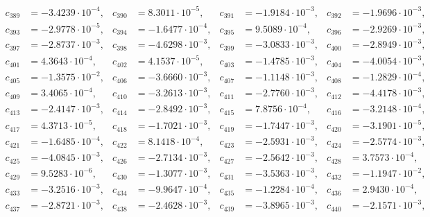 \begin{align*}
c_{ 389 } &= -3.4239 \cdot 10^{ -4 }, & c_{ 390 } &= 8.3011 \cdot 10^{ -5 }, & c_{ 391 } &= -1.9184 \cdot 10^{ -3 }, & c_{ 392 } &= -1.9696 \cdot 10^{ -3 },\\ 
c_{ 393 } &= -2.9778 \cdot 10^{ -5 }, & c_{ 394 } &= -1.6477 \cdot 10^{ -4 }, & c_{ 395 } &= 9.5089 \cdot 10^{ -4 }, & c_{ 396 } &= -2.9269 \cdot 10^{ -3 },\\ 
c_{ 397 } &= -2.8737 \cdot 10^{ -3 }, & c_{ 398 } &= -4.6298 \cdot 10^{ -3 }, & c_{ 399 } &= -3.0833 \cdot 10^{ -3 }, & c_{ 400 } &= -2.8949 \cdot 10^{ -3 },\\ 
c_{ 401 } &= 4.3643 \cdot 10^{ -4 }, & c_{ 402 } &= 4.1537 \cdot 10^{ -5 }, & c_{ 403 } &= -1.4785 \cdot 10^{ -3 }, & c_{ 404 } &= -4.0054 \cdot 10^{ -3 },\\ 
c_{ 405 } &= -1.3575 \cdot 10^{ -2 }, & c_{ 406 } &= -3.6660 \cdot 10^{ -3 }, & c_{ 407 } &= -1.1148 \cdot 10^{ -3 }, & c_{ 408 } &= -1.2829 \cdot 10^{ -4 },\\ 
c_{ 409 } &= 3.4065 \cdot 10^{ -4 }, & c_{ 410 } &= -3.2613 \cdot 10^{ -3 }, & c_{ 411 } &= -2.7760 \cdot 10^{ -3 }, & c_{ 412 } &= -4.4178 \cdot 10^{ -3 },\\ 
c_{ 413 } &= -2.4147 \cdot 10^{ -3 }, & c_{ 414 } &= -2.8492 \cdot 10^{ -3 }, & c_{ 415 } &= 7.8756 \cdot 10^{ -4 }, & c_{ 416 } &= -3.2148 \cdot 10^{ -4 },\\ 
c_{ 417 } &= 4.3713 \cdot 10^{ -5 }, & c_{ 418 } &= -1.7021 \cdot 10^{ -3 }, & c_{ 419 } &= -1.7447 \cdot 10^{ -3 }, & c_{ 420 } &= -3.1901 \cdot 10^{ -5 },\\ 
c_{ 421 } &= -1.6485 \cdot 10^{ -4 }, & c_{ 422 } &= 8.1418 \cdot 10^{ -4 }, & c_{ 423 } &= -2.5931 \cdot 10^{ -3 }, & c_{ 424 } &= -2.5774 \cdot 10^{ -3 },\\ 
c_{ 425 } &= -4.0845 \cdot 10^{ -3 }, & c_{ 426 } &= -2.7134 \cdot 10^{ -3 }, & c_{ 427 } &= -2.5642 \cdot 10^{ -3 }, & c_{ 428 } &= 3.7573 \cdot 10^{ -4 },\\ 
c_{ 429 } &= 9.5283 \cdot 10^{ -6 }, & c_{ 430 } &= -1.3077 \cdot 10^{ -3 }, & c_{ 431 } &= -3.5363 \cdot 10^{ -3 }, & c_{ 432 } &= -1.1947 \cdot 10^{ -2 },\\ 
c_{ 433 } &= -3.2516 \cdot 10^{ -3 }, & c_{ 434 } &= -9.9647 \cdot 10^{ -4 }, & c_{ 435 } &= -1.2284 \cdot 10^{ -4 }, & c_{ 436 } &= 2.9430 \cdot 10^{ -4 },\\ 
c_{ 437 } &= -2.8721 \cdot 10^{ -3 }, & c_{ 438 } &= -2.4628 \cdot 10^{ -3 }, & c_{ 439 } &= -3.8965 \cdot 10^{ -3 }, & c_{ 440 } &= -2.1571 \cdot 10^{ -3 },\\ 

\end{align*}

